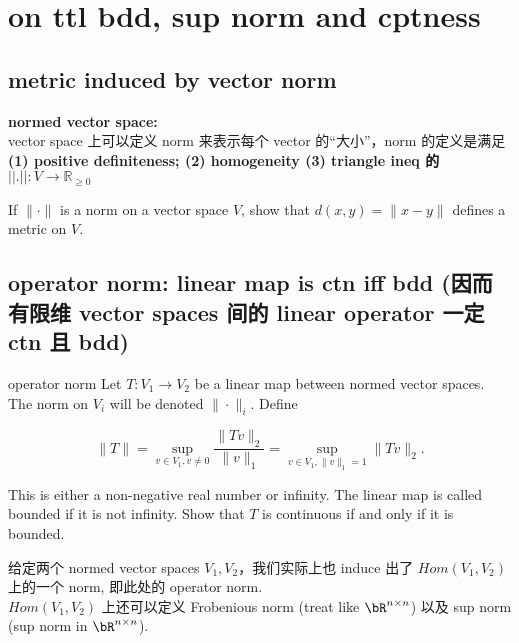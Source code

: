 \documentclass[lang=cn,11pt]{template}
\begin{document}




\chapter{on ttl bdd, sup norm and cptness}

\section{metric induced by vector norm}
\begin{definition}
    \textbf{normed vector space:} 
    \\vector space 上可以定义 norm 来表示每个 vector 的“大小”，norm 的定义是满足\\ \textbf{(1) positive definiteness; (2) homogeneity (3) triangle ineq 的 $||.||: V \rightarrow \mathbb{R}_{\geq0}$}
\end{definition}
If \( \|\cdot\| \) is a norm on a vector space \( V \), show that \( d(x, y) = \|x - y\| \) defines a metric on \( V \).

\section{operator norm: linear map is ctn iff bdd (因而有限维 vector spaces 间的 linear operator 一定 ctn 且 bdd)}

\begin{definition}{operator norm}\label{operator norm}
Let \( T: V_1 \to V_2 \) be a linear map between normed vector spaces. The norm on \( V_i \) will be denoted \( \|\cdot\|_i \). Define

\[
\|T\| = \sup_{v \in V_1, v \neq 0} \frac{\|T v\|_2}{\|v\|_1} = \sup_{v \in V_1, \|v\|_1 = 1} \|T v\|_2.
\]

This is either a non-negative real number or infinity. The linear map is called bounded if it is not infinity. Show that \( T \) is continuous if and only if it is bounded.

\end{definition}

\begin{remark}
    给定两个 normed vector spaces $V_1, V_2$，我们实际上也 induce 出了 $Hom(V_1, V_2)$ 上的一个 norm, 即此处的 operator norm.\\
    $Hom(V_1, V_2)$ 上还可以定义 Frobenious norm (treat like $\bR^{n \times n}$) 以及 sup norm (sup norm in $\bR^{n \times n}$).
\end{remark}
\end{document}
